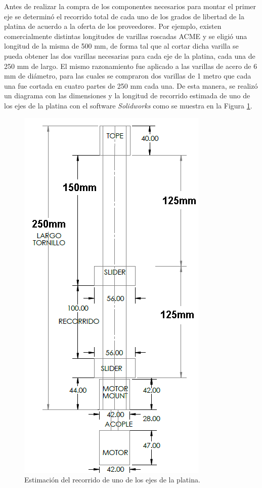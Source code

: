 Antes de realizar la compra de los componentes necesarios para montar el primer eje se determinó el recorrido total de cada uno de los grados de libertad de la platina de acuerdo a la oferta de los proveedores. Por ejemplo, existen comercialmente distintas longitudes de varillas roscadas ACME y se eligió una longitud de la misma de 500 mm, de forma tal que al cortar dicha varilla se pueda obtener las dos varillas necesarias para cada eje de la platina, cada una de 250 mm de largo. El mismo razonamiento fue aplicado a las varillas de acero de 6 mm de diámetro, para las cuales se compraron dos varillas de 1 metro que cada una fue cortada en cuatro partes de 250 mm cada una. De esta manera, se realizó un diagrama con las dimensiones y la longitud de recorrido estimada de uno de los ejes de la platina con el software \textit{Solidworks} como se muestra en la Figura \ref{fig:dimejee}.

\begin{figure}[H]
	\centering
	\includegraphics[scale=0.9]{Figs/microespectrometro/dimensio.png}
	\caption{Estimación del recorrido de uno de los ejes de la platina.}
	\label{fig:dimejee}
\end{figure}

